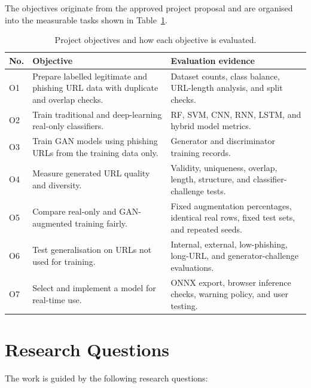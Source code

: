The objectives originate from the approved project proposal and are organised
into the measurable tasks shown in Table~\ref{tab:introduction-objectives}.

\begin{table}[htbp]
\centering
\caption{Project objectives and how each objective is evaluated.}
\label{tab:introduction-objectives}
\small
\begin{tabular}{@{}p{}p{}p{}@{}}
\toprule
No. & Objective & Evaluation evidence \\
\midrule
O1 & Prepare labelled legitimate and phishing URL data with duplicate and overlap checks. & Dataset counts, class balance, URL-length analysis, and split checks. \\
O2 & Train traditional and deep-learning real-only classifiers. & RF, SVM, CNN, RNN, LSTM, and hybrid model metrics. \\
O3 & Train GAN models using phishing URLs from the training data only. & Generator and discriminator training records. \\
O4 & Measure generated URL quality and diversity. & Validity, uniqueness, overlap, length, structure, and classifier-challenge tests. \\
O5 & Compare real-only and GAN-augmented training fairly. & Fixed augmentation percentages, identical real rows, fixed test sets, and repeated seeds. \\
O6 & Test generalisation on URLs not used for training. & Internal, external, low-phishing, long-URL, and generator-challenge evaluations. \\
O7 & Select and implement a model for real-time use. & ONNX export, browser inference checks, warning policy, and user testing. \\
\bottomrule
\end{tabular}
\end{table}

\section{Research Questions}

The work is guided by the following research questions:

